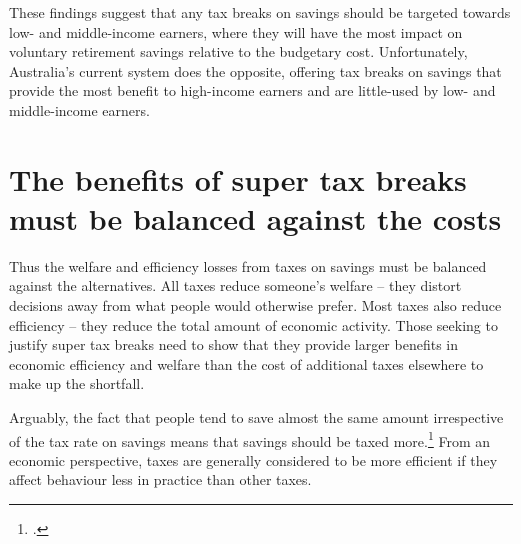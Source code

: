 These findings suggest that any tax breaks on savings should be targeted towards low- and middle-income earners, where they will have the most impact on voluntary retirement savings relative to the budgetary cost. Unfortunately, Australia’s current system does the opposite, offering tax breaks on savings that provide the most benefit to high-income earners and are little-used by low- and middle-income earners. 

\section{The benefits of super tax breaks must be balanced against the costs}\label{sec:SUPER-2-7}
Thus the welfare and efficiency losses from taxes on savings must be balanced against the alternatives. All taxes reduce someone’s welfare – they distort decisions away from what people would otherwise prefer. Most taxes also reduce efficiency – they reduce the total amount of economic activity. Those seeking to justify super tax breaks need to show that they provide larger benefits in economic efficiency and welfare than the cost of additional taxes elsewhere to make up the shortfall.

Arguably, the fact that people tend to save almost the same amount irrespective of the tax rate on savings means that savings should be taxed more.\footcite[][21]{Ingles2015}  From an economic perspective, taxes are generally considered to be more efficient if they affect behaviour less in practice than other taxes.

